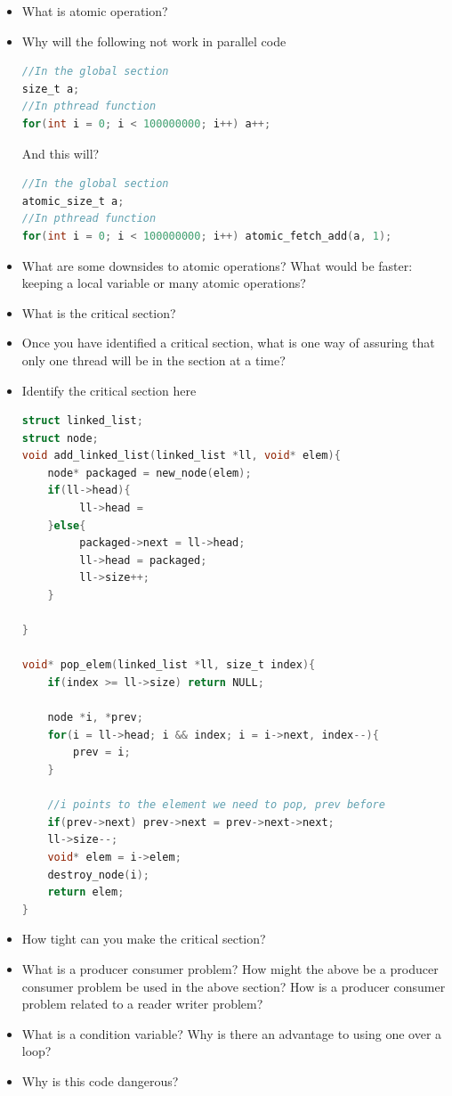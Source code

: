 \begin{itemize}
\tightlist
\item
  What is atomic operation?
\item
  Why will the following not work in parallel code

\begin{lstlisting}[language=C]
//In the global section
size_t a;
//In pthread function
for(int i = 0; i < 100000000; i++) a++;
\end{lstlisting}

  And this will?

\begin{lstlisting}[language=C]
//In the global section
atomic_size_t a;
//In pthread function
for(int i = 0; i < 100000000; i++) atomic_fetch_add(a, 1);
\end{lstlisting}
\item
  What are some downsides to atomic operations? What would be faster: keeping a local variable or many atomic operations?
\item
  What is the critical section?
\item
  Once you have identified a critical section, what is one way of assuring that only one thread will be in the section at a time?
\item
  Identify the critical section here

\begin{lstlisting}[language=C]
struct linked_list;
struct node;
void add_linked_list(linked_list *ll, void* elem){
    node* packaged = new_node(elem);
    if(ll->head){
         ll->head =
    }else{
         packaged->next = ll->head;
         ll->head = packaged;
         ll->size++;
    }

}

void* pop_elem(linked_list *ll, size_t index){
    if(index >= ll->size) return NULL;

    node *i, *prev;
    for(i = ll->head; i && index; i = i->next, index--){
        prev = i;
    }

    //i points to the element we need to pop, prev before
    if(prev->next) prev->next = prev->next->next;
    ll->size--;
    void* elem = i->elem;
    destroy_node(i);
    return elem;
}
\end{lstlisting}

\item How tight can you make the critical section?
\item What is a producer consumer problem? How might the above be a producer consumer problem be used in the above section? How is a producer consumer problem related to a reader writer problem?
\item What is a condition variable? Why is there an advantage to using one over a  loop?
\item Why is this code dangerous?


\end{itemize}
